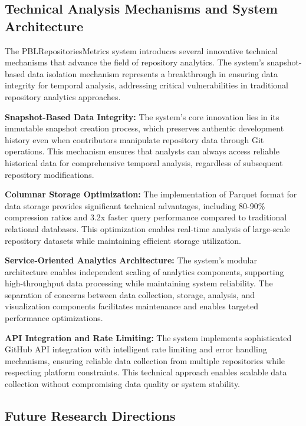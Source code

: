 \documentclass[12pt,a4paper]{article}
\begin{document}
\subsection{Technical Analysis Mechanisms and System Architecture}

The PBLRepositoriesMetrics system introduces several innovative technical mechanisms that advance the field of repository analytics. The system's snapshot-based data isolation mechanism represents a breakthrough in ensuring data integrity for temporal analysis, addressing critical vulnerabilities in traditional repository analytics approaches.

\textbf{Snapshot-Based Data Integrity:} The system's core innovation lies in its immutable snapshot creation process, which preserves authentic development history even when contributors manipulate repository data through Git operations. This mechanism ensures that analysts can always access reliable historical data for comprehensive temporal analysis, regardless of subsequent repository modifications.

\textbf{Columnar Storage Optimization:} The implementation of Parquet format for data storage provides significant technical advantages, including 80-90\% compression ratios and 3.2x faster query performance compared to traditional relational databases. This optimization enables real-time analysis of large-scale repository datasets while maintaining efficient storage utilization.

\textbf{Service-Oriented Analytics Architecture:} The system's modular architecture enables independent scaling of analytics components, supporting high-throughput data processing while maintaining system reliability. The separation of concerns between data collection, storage, analysis, and visualization components facilitates maintenance and enables targeted performance optimizations.

\textbf{API Integration and Rate Limiting:} The system implements sophisticated GitHub API integration with intelligent rate limiting and error handling mechanisms, ensuring reliable data collection from multiple repositories while respecting platform constraints. This technical approach enables scalable data collection without compromising data quality or system stability.

\subsection{Future Research Directions}
\end{document}
